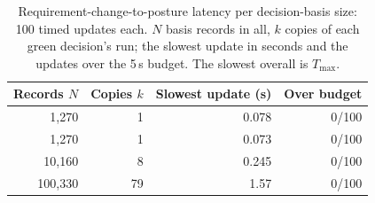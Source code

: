 \begin{table}[pos=tbp]
\centering\small
\caption{Requirement-change-to-posture latency per decision-basis size: 100 timed updates each. $N$ basis records in all, $k$ copies of each green decision's run; the slowest update in seconds and the updates over the 5\,s budget. The slowest overall is $T_{\max}$.}
\label{tab:scale-results}
\begin{tabular*}{\columnwidth}{@{\extracolsep{\fill}}rrrr@{}}
\toprule
Records $N$ & Copies $k$ & Slowest update (s) & Over budget \\
\midrule
1,270 & 1 & 0.078 & 0/100 \\
1,270 & 1 & 0.073 & 0/100 \\
10,160 & 8 & 0.245 & 0/100 \\
100,330 & 79 & 1.57 & 0/100 \\
\bottomrule
\end{tabular*}
\end{table}
